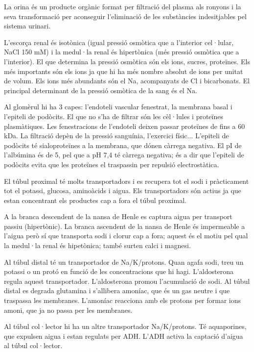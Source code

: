 La orina és un producte orgànic format per filtració del plasma als
ronyons i la seva transformació per aconseguir l'eliminació de les
substàncies indesitjables pel sistema urinari.


L'escorça renal és isotònica (igual pressió osmòtica que a l'interior
cel·lular, NaCl 150 mM) i la medul·la renal és hipertònica (més
pressió osmòtica que a l'interior). El que determina la pressió
osmòtica són els ions, sucres, proteïnes. Els més importants són els
ions ja que hi ha més nombre absolut de ions per unitat de volum. Els
ions més abundants són el Na, acompanyats de Cl i bicarbonats. El
principal determinant de la pressió osmòtica de la sang és el Na.

Al glomèrul hi ha 3 capes: l'endoteli vascular fenestrat, la membrana
basal i l'epiteli de podòcits. El que no s'ha de filtrar són les
cèl·lules i proteïnes plasmàtiques. Les fenestracions de l'endoteli
deixen passar proteïnes de fins a 60 kDa. La filtració depèn de la
pressió sanguínia, l'exercici físic... L'epiteli de podòcits té
sialoproteïnes a la membrana, que dónen càrrega negativa. El pI de
l'albúmina és de 5, pel que a pH 7,4 té càrrega negativa; és a dir que
l'epiteli de podòcits evita que les proteïnes el traspassin per
repulsió electrostàtica.

El túbul proximal té molts transportadors i es recupera tot el sodi i
pràcticament tot el potassi, glucosa, aminoàcids i aigua. Els
transportadors són actius ja que estan concentrant els productes cap a
fora el túbul proximal.

A la branca descendent de la nansa de Henle es captura aigua per
transport passiu (hipertònic). La branca ascendent de la nansa de
Henle és impermeable a l'aigua però sí que transporta sodi i clorur
cap a fora; aquest és el motiu pel qual la medul·la renal és
hipetònica; també surten calci i magnesi.

Al túbul distal té un transportador de Na/K/protons. Quan agafa sodi,
treu un potassi o un protó en funció de les concentracions que hi
hagi. L'aldosterona regula aquest transportador. L'aldosterona promou
l'acumulació de sodi. Al túbul distal es degrada glutamina i
s'allibera amoníac, que és un gas neutre i que traspassa les
membranes. L'amoníac reacciona amb els protons per formar ions amoni,
que ja no passa per les membranes.

Al túbul col·lector hi ha un altre transportador Na/K/protons. Té
aquaporines, que expulsen aigua i estan regulats per ADH. L'ADH activa
la captació d'aigua al túbul col·lector.

